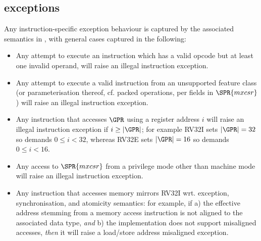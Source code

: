 \subsection{\XCID exceptions}
\label{sec:spec:exceptions}


Any instruction-specific exception behaviour is captured by the associated
semantics in , with general cases captured in
the following:

\begin{itemize}
\item Any attempt to execute an \XCID instruction which
      has a    valid opcode but at least one invalid operand,
      will raise an 
      illegal instruction exception.
\item Any attempt to execute a
        valid \XCID instruction
      from an unsupported feature class (or parameterisation thereof, cf. packed operations, per fields in $\SPR{mxcsr}$)
      will raise an 
      illegal instruction exception.
\item Any instruction that accesses $\GPR$ using a register address $i$ 
      will raise an
      illegal instruction exception
      if $i \geq |\GPR|$; for example
      RV32I sets $|\GPR| = 32$ so demands $0 \leq i < 32$,
      whereas
      RV32E sets $|\GPR| = 16$ so demands $0 \leq i < 16$.
\item Any access to
      $\SPR{mxcsr}$
      from a privilege mode other than machine mode
      will raise an 
      illegal instruction exception.
\item Any instruction that accesses memory mirrors RV32I wrt. exception,
      synchronisation, and atomicity semantics: for example, if
      a) the effective address stemming from a memory access instruction
         is not aligned to the associated data type, 
         {\em  and}
      b) the implementation does not support misaligned accesses,
         {\em then} it 
      will raise a 
      load/store address misaligned exception.
\end{itemize}

